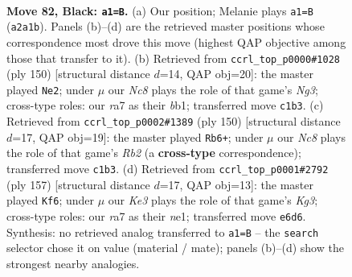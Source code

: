 \documentclass[11pt]{article}
\begin{document}
\clearpage

\begin{figure}[p]\centering
\begin{subfigure}{0.46\textwidth}\centering
\resizebox{\linewidth}{!}{%
\newchessgame
\chessboard[
  setfen={8/R6P/4k1p1/5p2/5P2/5K2/p7/2n5 b - - 0 82},
  showmover=false,
  pgfstyle=straightmove, color=movearrow, markmove={a2-a1}
]}
\caption{}
\end{subfigure}\hfill
\begin{subfigure}{0.46\textwidth}\centering
\resizebox{\linewidth}{!}{%
\newchessgame
\chessboard[
  setfen={8/5kp1/8/5PK1/p7/P5N1/1P6/1b6 w - - 23 76},
  showmover=false,
  pgfstyle=straightmove, color=movearrow, markmove={g3-e2}
]}
\caption{}
\end{subfigure}
\\[4pt]
\begin{subfigure}{0.46\textwidth}\centering
\resizebox{\linewidth}{!}{%
\newchessgame
\chessboard[
  setfen={8/8/7k/r6p/7P/6PK/PR6/8 w - - 15 76},
  showmover=false,
  pgfstyle=straightmove, color=movearrow, markmove={b2-b6}
]}
\caption{}
\end{subfigure}\hfill
\begin{subfigure}{0.46\textwidth}\centering
\resizebox{\linewidth}{!}{%
\newchessgame
\chessboard[
  setfen={8/8/6k1/6p1/3n2P1/5p2/5P2/4N1K1 b - - 0 79},
  showmover=false,
  pgfstyle=straightmove, color=movearrow, markmove={g6-f6}
]}
\caption{}
\end{subfigure}
\caption{\textbf{Move 82, Black: \texttt{a1=B}.} (a) Our position; Melanie plays \texttt{a1=B} (\texttt{a2a1b}). Panels (b)--(d) are the retrieved master positions whose correspondence most drove this move (highest QAP objective among those that transfer to it). (b) Retrieved from \texttt{ccrl\_top\_p0000\#1028} (ply 150) [structural distance $d$=14, QAP obj=20]: the master played \texttt{Ne2}; under $\mu$ our \emph{Nc8} plays the role of that game's \emph{Ng3}; cross-type roles: our \emph{r}a7 as their \emph{b}b1; transferred move \texttt{c1b3}. (c) Retrieved from \texttt{ccrl\_top\_p0002\#1389} (ply 150) [structural distance $d$=17, QAP obj=19]: the master played \texttt{Rb6+}; under $\mu$ our \emph{Nc8} plays the role of that game's \emph{Rb2} (a \textbf{cross-type} correspondence); transferred move \texttt{c1b3}. (d) Retrieved from \texttt{ccrl\_top\_p0001\#2792} (ply 157) [structural distance $d$=17, QAP obj=13]: the master played \texttt{Kf6}; under $\mu$ our \emph{Ke3} plays the role of that game's \emph{Kg3}; cross-type roles: our \emph{r}a7 as their \emph{n}e1; transferred move \texttt{e6d6}. Synthesis: no retrieved analog transferred to \texttt{a1=B} -- the \texttt{search} selector chose it on value (material / mate); panels (b)--(d) show the strongest nearby analogies.}
\label{fig:thought-m163}
\end{figure}
\end{document}
